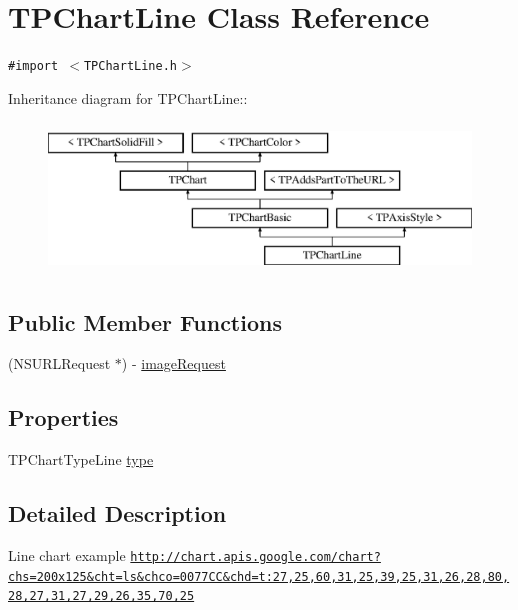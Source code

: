 \hypertarget{interface_t_p_chart_line}{
\section{TPChartLine Class Reference}
\label{interface_t_p_chart_line}
}
{\tt \#import $<$TPChartLine.h$>$}

Inheritance diagram for TPChartLine::\begin{figure}[H]
\begin{center}
\leavevmode
\includegraphics[height=4cm]{interface_t_p_chart_line}
\end{center}
\end{figure}
\subsection*{Public Member Functions}
\begin{CompactItemize}
\item 
(NSURLRequest $\ast$) - \hyperlink{interface_t_p_chart_line_2fa4ce27ed67bce0c2d0d2a9b41c026c}{imageRequest}
\end{CompactItemize}
\subsection*{Properties}
\begin{CompactItemize}
\item 
TPChartTypeLine \hyperlink{interface_t_p_chart_line_04e85b606d425d8329ea5f9b0ec0f50f}{type}
\end{CompactItemize}


\subsection{Detailed Description}
Line chart example \href{http://chart.apis.google.com/chart?chs=200x125&cht=ls&chco=0077CC&chd=t:27,25,60,31,25,39,25,31,26,28,80,28,27,31,27,29,26,35,70,25}{\tt http://chart.apis.google.com/chart?chs=200x125\&cht=ls\&chco=0077CC\&chd=t:27,25,60,31,25,39,25,31,26,28,80,28,27,31,27,29,26,35,70,25} 

